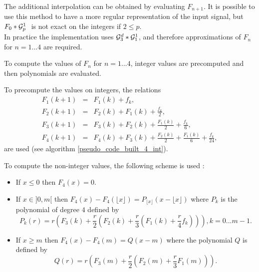 The additional interpolation can be obtained by evaluating $F_{n+1}$.
It is possible to use this method to have a more regular representation of the input signal, but $F_0 * \mathcal{G}_p^1~$ is not exact on the integers if $2\le p$.\\
In practice the implementation uses $\mathcal{G}_3^d * \mathcal{G}_1^1$, and therefore approximations of $F_n$ for $n=1...4$ are required.



To compute the values of $F_n$ for $n=1...4$, integer values are precomputed and then polynomials are evaluated.


To precompute the values on integers, the relations
\begin{eqnarray*}
F_{1}(k+1)&=&  F_{1}(k)+f_{k} , \\
F_{2}(k+1)&=&  F_{2}(k)+F_{1}(k)+\frac{f_{k}}{2} ,  \\
F_{3}(k+1)&=&  F_{3}(k)+F_{2}(k)+\frac{F_{1}(k)}{2}+\frac{f_{k}}{6}  , \\
F_{4}(k+1)&=&  F_{4}(k)+F_{3}(k)+\frac{F_{2}(k)}{2}+\frac{F_{1}(k)}{6}+\frac{f_{k}}{24}  ,
\end{eqnarray*}
are used (see algorithm \ref{pseudo_code_built_4_int}).



To compute the non-integer values, the following scheme is used :

\begin{itemize}
\item If $x\le 0$ then $F_{4}(x)=0$.
\item If $x\in ]0 , m[$ then $F_{4}(x)-F_{4}(\lfloor x \rfloor)=P_{\lfloor x \rfloor}(x-\lfloor x \rfloor)$ where $P_k$ is the polynomial of degree $4$ defined by
\begin{equation*}
P_k (r) =r \left( F_{3}(k) +\frac{r}{2} \left(F_{2}(k)+ \frac{r}{3}\left(F_{1}(k)+\frac{r}{4} f_{k}\right)\right)\right), k=0...m-1.
\end{equation*}
\item If $x\ge m$ then $F_{4}(x)-F_{4}(m)=Q(x-m)$ where the polynomial $Q$ is defined by
\begin{equation*}
Q(r)=r \left(F_{3}(m)+\frac{r}{2} \left( F_{2}(m) + \frac{r}{3} F_1 (m)\right)\right).
\end{equation*}\
\end{itemize}

